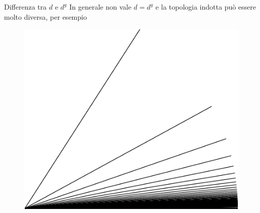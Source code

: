 \documentclass{beamer}
\newcounter{counter1}
\theoremstyle{plain}
\theoremstyle{definition}
\newtheorem{myes}[counter1]{Esempio}
\theoremstyle{remark}
\newcommand{\set}[1]{\left\{#1\right\}}
\newcommand{\pa}[1]{\left(#1\right)}
\newcommand{\bra}[1]{\left[#1\right]}
\begin{document}
\begin{frame}{Differenza tra $d$ e $d^g$}
  In generale non vale $d=d^g$ e la topologia indotta può essere molto
  diversa, per esempio

  \begin{figure}[h]
    \includegraphics[scale=.7]{noncompattogeodetiche.pdf}
  \end{figure}
    
    
\end{frame}

\end{document}

